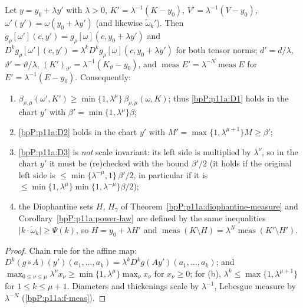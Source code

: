 \begin{lemma}\label{bpP:p11a:chart-scaling}
Let $y=y_0+\lambda y'$ with $\lambda>0$, $K'=\lambda^{-1}(K-y_0)$, $V'=\lambda^{-1}(V-y_0)$, $\omega'(y')=\omega(y_0+\lambda y')$ (and likewise $\tilde\omega_k'$). Then $g_\rho[\omega'](c,y')=g_\rho[\omega](c,y_0+\lambda y')$ and $D^kg_\rho[\omega'](c,y')=\lambda^kD^kg_\rho[\omega](c,y_0+\lambda y')$ for both tensor norms; $d'=d/\lambda$, $\vartheta'=\vartheta/\lambda$, $(K')_{\vartheta'}=\lambda^{-1}(K_\vartheta-y_0)$, and $\operatorname{meas}E'=\lambda^{-N}\operatorname{meas}E$ for $E'=\lambda^{-1}(E-y_0)$. Consequently:
\begin{enumerate}[label=(\alph*)]
\item $\beta_{\rho,\mu}(\omega',K')\ge\min\{1,\lambda^\mu\}\,\beta_{\rho,\mu}(\omega,K)$; thus \ref{bpP:p11a:D1} holds in the chart $y'$ with $\beta'=\min\{1,\lambda^\mu\}\beta$;
\item \ref{bpP:p11a:D2} holds in the chart $y'$ with $M'=\max\{1,\lambda^{\mu+1}\}M\ge\beta'$;
\item \ref{bpP:p11a:D3} is \emph{not} scale invariant: its left side is multiplied by $\lambda^\nu$, so in the chart $y'$ it must be (re)checked with the bound $\beta'/2$ (it holds if the original left side is $\le\min\{\lambda^{-\mu},1\}\,\beta'/2$, in particular if it is $\le\min\{1,\lambda^\mu\}\min\{1,\lambda^{-\mu}\}\beta/2$);
\item the Diophantine sets $H$, $H_\gamma$ of Theorem~\ref{bpP:p11a:diophantine-measure} and Corollary~\ref{bpP:p11a:power-law} are defined by the same inequalities $\lvert k\cdot\tilde\omega_k\rvert\ge\Psi(k)$, so $H=y_0+\lambda H'$ and $\operatorname{meas}(K\setminus H)=\lambda^N\operatorname{meas}(K'\setminus H')$.
\end{enumerate}
\end{lemma}
\begin{proof}
Chain rule for the affine map: $D^k(g\circ A)(y')(a_1,\dots,a_k)=\lambda^kD^kg(Ay')(a_1,\dots,a_k)$; and $\max_{0\le\nu\le\mu}\lambda^\nu x_\nu\ge\min\{1,\lambda^\mu\}\max_\nu x_\nu$ for $x_\nu\ge0$; for (b), $\lambda^k\le\max\{1,\lambda^{\mu+1}\}$ for $1\le k\le\mu+1$. Diameters and thickenings scale by $\lambda^{-1}$, Lebesgue measure by $\lambda^{-N}$ (\ref{bpP:p11a:f-meas}).
\end{proof}

